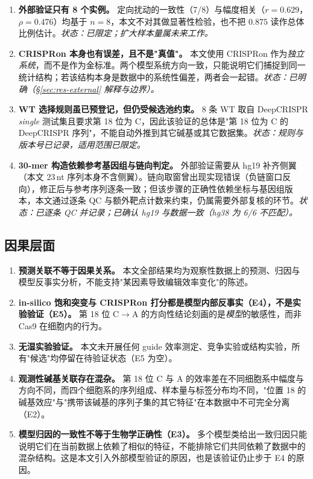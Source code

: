 \begin{enumerate}
\item \textbf{外部验证只有 8 个实例。} 定向扰动的一致性（7/8）与幅度相关（$r=0.629$，$\rho=0.476$）均基于 $n=8$，本文不对其做显著性检验，也不把 $0.875$ 读作总体比例估计。\emph{状态：已限定；扩大样本量属未来工作。}
\item \textbf{CRISPRon 本身也有误差，且不是"真值"。} 本文使用 CRISPRon 作为\emph{独立系统}，而不是作为金标准。两个模型系统方向一致，只能说明它们捕捉到同一统计结构；若该结构本身是数据中的系统性偏差，两者会一起错。\emph{状态：已明确（\S\ref{sec:res-external} 解释与边界）。}
\item \textbf{WT 选择规则虽已预登记，但仍受候选池约束。} 8 条 WT 取自 DeepCRISPR \emph{single} 测试集且要求第 18 位为 C，因此该验证的总体是"第 18 位为 C 的 DeepCRISPR 序列"，不能自动外推到其它碱基或其它数据集。\emph{状态：规则与版本号已记录，适用范围已限定。}
\item \textbf{30-mer 构造依赖参考基因组与链向判定。} 外部验证需要从 hg19 补齐侧翼（本文 23\,nt 序列本身不含侧翼）。链向取窗曾出现实现错误（负链窗口反向），修正后与参考序列逐条一致；但该步骤的正确性依赖坐标与基因组版本，本文通过逐条 QC 与额外靶点计数来约束，仍属需要外部复核的环节。\emph{状态：已逐条 QC 并记录；已确认 hg19 与数据一致（hg38 为 6/6 不匹配）。}
\end{enumerate}

\subsection{因果层面}

\begin{enumerate}
\item \textbf{预测关联不等于因果关系。} 本文全部结果均为观察性数据上的预测、归因与模型反事实分析，不能支持"某因素导致编辑效率变化"的陈述。
\item \textbf{in-silico 饱和突变与 CRISPRon 打分都是模型内部反事实（E4），不是实验验证（E5）。} 第 18 位 C$\rightarrow$A 的方向性结论刻画的是\emph{模型}的敏感性，而非 Cas9 在细胞内的行为。
\item \textbf{无湿实验验证。} 本文未开展任何 guide 效率测定、竞争实验或结构实验，所有"候选"均停留在待验证状态（E5 为空）。
\item \textbf{观测性碱基关联存在混杂。} 第 18 位 C 与 A 的效率差在不同细胞系中幅度与方向不同，而四个细胞系的序列组成、样本量与标签分布均不同，"位置 18 的碱基效应"与"携带该碱基的序列子集的其它特征"在本数据中不可完全分离（E2）。
\item \textbf{模型归因的一致性不等于生物学正确性（E3）。} 多个模型类给出一致归因只能说明它们在当前数据上依赖了相似的特征，不能排除它们共同依赖了数据中的混杂结构。这是本文引入外部模型验证的原因，也是该验证仍止步于 E4 的原因。
\end{enumerate}

